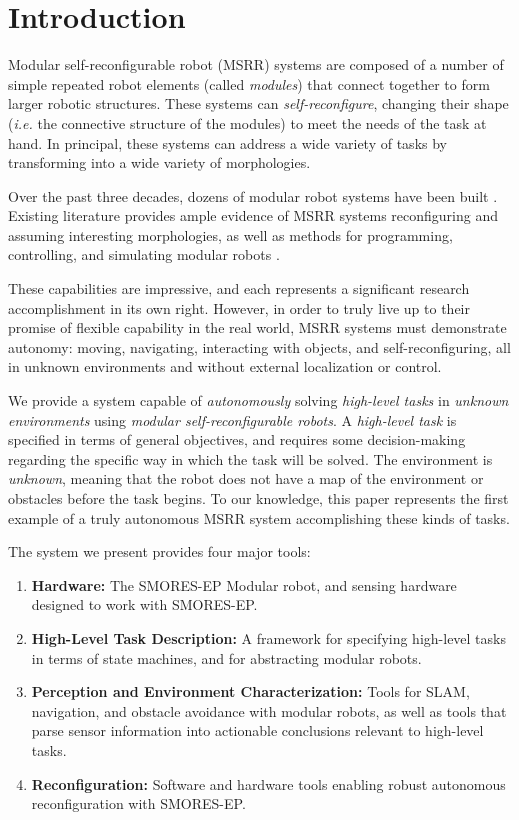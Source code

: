 \documentclass[conference]{IEEEtran}
\begin{document}
\section{Introduction} \label{sec:introduction}
%
Modular self-reconfigurable robot (MSRR) systems are composed of a number of simple repeated robot elements (called \emph{modules}) that connect together to form larger robotic structures. These systems can \emph{self-reconfigure}, changing their shape (\emph{i.e.} the connective structure of the modules) to meet the needs of the task at hand.
In principal, these systems can address a wide variety of tasks by transforming into a wide variety of morphologies.   

Over the past three decades, dozens of modular robot systems have been built \cite{Yim2007a}. Existing literature provides ample evidence of MSRR systems reconfiguring and assuming interesting morphologies, as well as methods for programming, controlling, and simulating modular robots \cite{Yim2007,Jing2016,Yim1994}.

These capabilities are impressive, and each represents a significant research accomplishment in its own right. However, in order to truly live up to their promise of flexible capability in the real world, MSRR systems must demonstrate autonomy: moving, navigating, interacting with objects, and self-reconfiguring, all in unknown environments and without external localization or control. 

We provide a system capable of \emph{autonomously} solving \emph{high-level
tasks} in \emph{unknown environments} using \emph{modular self-reconfigurable
robots}.  A \emph{high-level task} is specified in terms
of general objectives, and requires some decision-making regarding the specific
way in which the task will be solved. The environment is \emph{unknown}, meaning
that the robot does not have a map of the environment or obstacles before the
task begins. To our knowledge, this paper represents the first example of a truly autonomous MSRR system accomplishing these kinds of tasks.

The system we present provides four major tools:

\begin{enumerate}
\item \textbf{Hardware:} The SMORES-EP Modular robot, and sensing hardware designed
to work with SMORES-EP.  
\item \textbf{High-Level Task Description:} A framework for specifying high-level
tasks in terms of state machines, and for abstracting modular robots.
\item \textbf{Perception and Environment Characterization:} Tools for SLAM,
navigation, and obstacle avoidance with modular robots, as well as tools that
parse sensor information into actionable conclusions relevant to high-level
tasks.
\item \textbf{Reconfiguration:} Software and hardware tools enabling robust
autonomous reconfiguration with SMORES-EP.
\end{enumerate}
\end{document}
